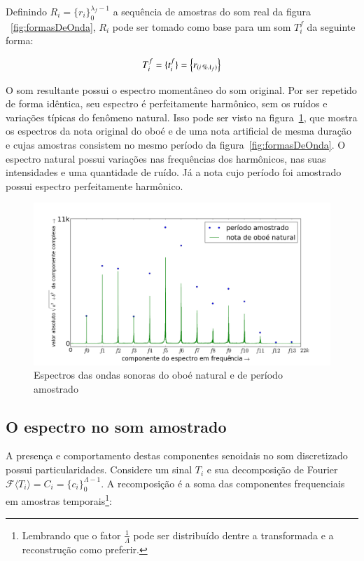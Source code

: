 Definindo $ R_i=\{ r_i \}_0^{\lambda_f-1}$ a sequência de amostras do som real da figura ~\ref{fig:formasDeOnda},
$R_i$ pode ser tomado como base para um som $T_i^f$ da seguinte forma: 

\begin{equation}\label{sampleandoFormaDeOnda}
     T^f_i=\{ t_i^f \}=\Bigl\{ r_{(i\,\%\lambda_{f})} \Bigr\}
\end{equation}

O som resultante possui o espectro momentâneo do som original. Por ser repetido de forma idêntica,
seu espectro é perfeitamente harmônico, sem os ruídos e variações típicas do fenômeno natural. Isso pode ser 
visto na figura~\ref{fig:espectroOboe}, que mostra os espectros da nota original do oboé e de uma nota 
artificial de mesma duração e cujas amostras consistem no mesmo período da figura~\ref{fig:formasDeOnda}. O espectro natural possui variações nas frequências dos harmônicos, nas suas intensidades e uma quantidade de ruído. Já a nota cujo período foi amostrado possui espectro perfeitamente harmônico.



\begin{figure}[h!]
    \centering
        \includegraphics[width=\textwidth]{figuras/espectroOboeAmostradoNatural3}
    \caption{Espectros das ondas sonoras do oboé natural e de período amostrado}
        \label{fig:espectroOboe}
\end{figure}





\subsection{O espectro no som amostrado}
A presença e comportamento destas componentes senoidais 
no som discretizado possui particularidades. Considere um sinal $T_i$ e sua decomposição de Fourier $\mathcal{F}\langle T_i\rangle=C_i=\{c_i\}_0^{\Lambda-1}$. A recomposição é a soma das componentes frequenciais em amostras temporais\footnote{Lembrando que o fator $\frac{1}{\Lambda}$ pode ser distribuído dentre a transformada e a reconstrução como preferir.}:

